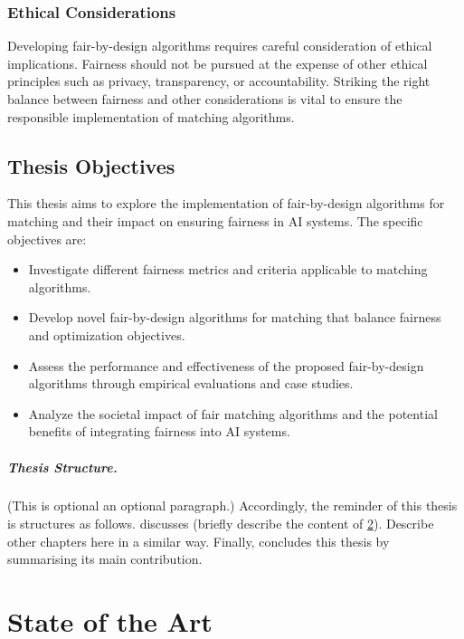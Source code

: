 \documentclass[12pt,a4paper,openright,twoside]{book}
\begin{document}
\subsection{Ethical Considerations}
Developing fair-by-design algorithms requires careful consideration of ethical implications. Fairness should not be pursued at the expense of other ethical principles such as privacy, transparency, or accountability. Striking the right balance between fairness and other considerations is vital to ensure the responsible implementation of matching algorithms.

\section{Thesis Objectives}
This thesis aims to explore the implementation of fair-by-design algorithms for matching and their impact on ensuring fairness in AI systems. The specific objectives are:

\begin{itemize}
    \item Investigate different fairness metrics and criteria applicable to matching algorithms.
    \item Develop novel fair-by-design algorithms for matching that balance fairness and optimization objectives.
    \item Assess the performance and effectiveness of the proposed fair-by-design algorithms through empirical evaluations and case studies.
    \item Analyze the societal impact of fair matching algorithms and the potential benefits of integrating fairness into AI systems.
\end{itemize}


%
\paragraph{Thesis Structure.} %
%

(This is optional an optional paragraph.)
%
Accordingly, the reminder of this thesis is structures as follows.
%
 discusses (briefly describe the content of \cref{chap:background}).
%
Describe other chapters here in a similar way.
%
Finally,  concludes this thesis by summarising its main contribution.

\chapter{State of the Art} %
\label{chap:background}
\end{document}

